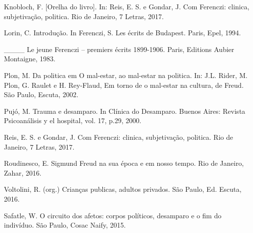 Knobloch, F. {[}Orelha do livro{]}. In: Reis, E. S. e Gondar, J. Com
Ferenczi: clinica, subjetivação, politica. Rio de Janeiro, 7 Letras,
2017.

Lorin, C. Introdução. In Ferenczi, S. Les écrits de Budapest. Paris,
Epel, 1994.

\_\_\_\_ Le jeune Ferenczi -- premiers écrits 1899-1906. Paris, Editions
Aubier Montaigne, 1983.

Plon, M. Da politica em O mal-estar, ao mal-estar na politica. In: J.L.
Rider, M. Plon, G. Raulet e H. Rey-Flaud, Em torno de o mal-estar na
cultura, de Freud. São Paulo, Escuta, 2002.

Pujó, M. Trauma e desamparo. In Clínica do Desamparo. Buenos Aires:
Revista Psicoanálisis y el hospital, vol. 17, p.29, 2000.

Reis, E. S. e Gondar, J. Com Ferenczi: clinica, subjetivação, politica.
Rio de Janeiro, 7 Letras, 2017.

Roudinesco, E. Sigmund Freud na sua época e em nosso tempo. Rio de
Janeiro, Zahar, 2016.

Voltolini, R. (org.) Crianças publicas, adultos privados. São Paulo, Ed.
Escuta, 2016.

Safatle, W. O circuito dos afetos: corpos políticos, desamparo e o fim
do indivíduo. São Paulo, Cosac Naify, 2015.
